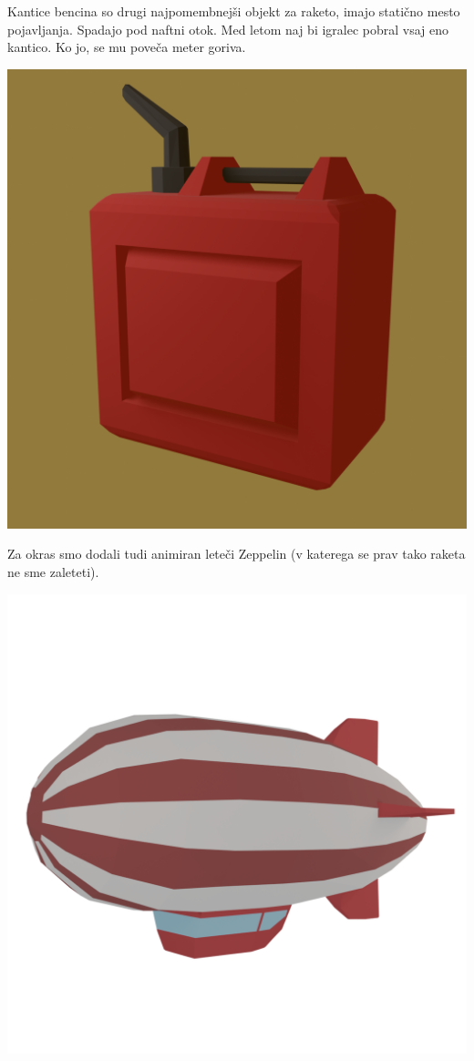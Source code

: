 \documentclass[a4paper]{article}
\begin{document}
Kantice bencina so drugi najpomembnejši objekt za raketo, imajo statično mesto pojavljanja. Spadajo pod naftni otok. Med letom naj bi igralec pobral vsaj eno kantico. Ko jo, se mu poveča meter goriva.
\begin{center}
     \includegraphics[width=\columnwidth]{bzn.jpg}
\end{center}

Za okras smo dodali tudi animiran leteči Zeppelin (v katerega se prav tako raketa ne sme zaleteti). 
\begin{center}
     \includegraphics[width=\columnwidth]{zeppelin.jpg}
\end{center}
\end{document}
